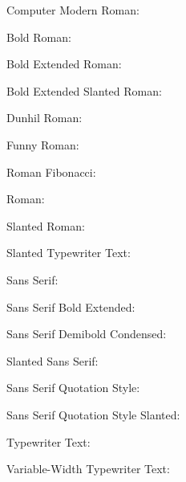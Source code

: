 \documentclass[10pt,a4paper]{article}
\newcommand{\Ligature}{%

}
\begin{document}
Computer Modern Roman:\\{\Ligature}

Bold Roman:\\{\olb \Ligature}

Bold Extended Roman:\\{\olbx \Ligature}

Bold Extended Slanted Roman:\\{\olbxs \Ligature}

Dunhil Roman:\\{\oldunh \Ligature}

Funny Roman:\\{\olff \Ligature}

Roman Fibonacci:\\{\olfib \Ligature}

Roman:\\{\olr \Ligature}

Slanted Roman:\\{\olsl \Ligature}

Slanted Typewriter Text:\\{\olsltt \Ligature}

Sans Serif:\\{\olss \Ligature}

Sans Serif Bold Extended:\\{\olssbx \Ligature}

Sans Serif Demibold Condensed:\\{\olssdc \Ligature}

Slanted Sans Serif:\\{\olssi \Ligature}

Sans Serif Quotation Style:\\{\olssq \Ligature}

Sans Serif Quotation Style Slanted:\\{\olssqi \Ligature}

Typewriter Text:\\{\oltt \Ligature}

Variable-Width Typewriter Text:\\{\olvtt \Ligature}
\end{document}
